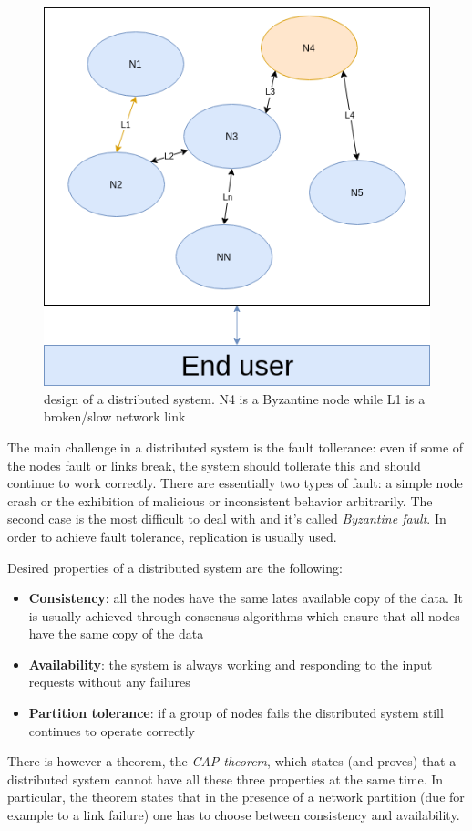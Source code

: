 \begin{figure}[!htb]
	\centering
	\includegraphics[width=0.6\linewidth]{img/distributed-system.png}
	\caption{design of a distributed system. N4 is a Byzantine node while L1 is a
  broken/slow network link}
	\label{fig:distributed-system}
\end{figure}

The main challenge in a distributed system is the fault tollerance: even if some
of the nodes fault or links break, the system should tollerate this and should
continue to work correctly. There are essentially two types of fault: a simple node
crash or the exhibition of malicious or inconsistent behavior arbitrarily. The
second case is the most difficult to deal with and it's called \emph{Byzantine
fault}. In order to achieve fault tolerance, replication is usually used.

Desired properties of a distributed system are the following:
\begin{itemize}
  \item \textbf{Consistency}: all the nodes have the same lates available copy of
  the data. It is usually achieved through consensus algorithms which ensure that
  all nodes have the same copy of the data
  \item \textbf{Availability}: the system is always working and responding to the
  input requests without any failures
  \item \textbf{Partition tolerance}: if a group of nodes fails the distributed
  system still continues to operate correctly
\end{itemize}
There is however a theorem, the \emph{CAP theorem}, which states (and proves)
that a distributed system cannot have all these three properties at the same time.
In particular, the theorem states that in the presence of a network partition (due
for example to a link failure) one has to choose between consistency and availability.



